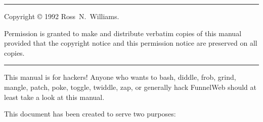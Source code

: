 %
%

\vbox{\relax}
\vfill

\hrule

\medskip

Copyright \copyright{} 1992 Ross~N.~Williams.

Permission is granted to make and distribute verbatim copies of this manual
provided that the copyright notice and this permission notice are preserved
on all copies.

\medskip

\hrule

\newpage


\tableofcontents

\newpage







This manual is for hackers! Anyone who wants to
bash,
diddle,
frob,
grind,
mangle,
patch,
poke,
toggle,
twiddle,
zap,
or generally hack FunnelWeb should at least take a look at this manual.

This document has been created to serve two purposes:

